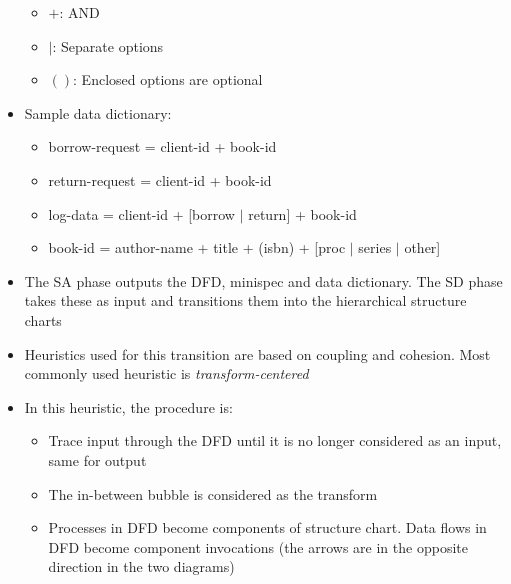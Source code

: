 \documentclass{article}
\begin{document}
\begin{itemize}
\begin{itemize}
        \item $+$: AND
        
        \item $|$: Separate options
        
        \item $()$: Enclosed options are optional
    \end{itemize}
    
    \item Sample data dictionary:
    \begin{itemize}
        \item borrow-request = client-id + book-id 
        
        \item return-request = client-id + book-id 
        
        \item log-data = client-id + [borrow $|$ return] + book-id 
        
        \item book-id = author-name + title + (isbn) +  [proc $|$ series $|$ other] 
    \end{itemize}
    
    \item The SA phase outputs the DFD, minispec and data dictionary. The SD phase takes these as input and transitions them into the hierarchical structure charts
    
    \item Heuristics used for this transition are based on coupling and cohesion. Most commonly used heuristic is \textit{transform-centered}
    
    \item In this heuristic, the procedure is:
    \begin{itemize}
        \item Trace input through the DFD until it is no longer considered as an input, same for output
        
        \item The in-between bubble is considered as the transform
        
        \item Processes in DFD become components of structure chart. Data flows in DFD become component invocations (the arrows are in the opposite direction in the two diagrams)
    \end{itemize}
\end{itemize}
\end{document}
